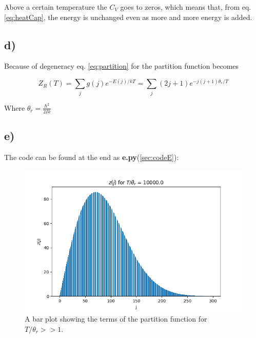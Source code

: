 \documentclass[a4paper,norsk, 10pt]{article}
\begin{document}
Above a certain temperature the $C_V$ goes to zeros, which means that, from eq. \eqref{eq:heatCap}, the energy is unchanged even as more and more energy is added.

\subsection{d)}

Because of degeneracy eq. \eqref{eq:partition} for the partition function becomes

\begin{equation}
Z_R(T) = \sum_j g(j)e^{-E(j)/kT} = \sum_j (2j + 1) e^{-j(j+1)\theta_r/T}
\end{equation}\label{eq:partitionD}

Where $\theta_r = \frac{\hbar^2}{2Ik}$

\subsection{e)}

The code can be found at the end as \textbf{e.py}(\ref{sec:codeE}):

\begin{figure}[H]
\centering
\includegraphics[scale=0.5]{e_stor.png}
\caption{A bar plot showing the terms of the partition function for $T/\theta_r >> 1$.}
\end{figure}\label{fig:large}
\end{document}
